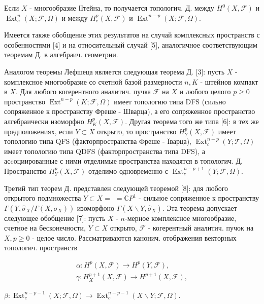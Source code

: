 \documentclass[10pt]{article}
\begin{document}
Если $X$ - многообразие ІІтейна, то получается топологич. Д. между $H^{0}(X, \mathscr{F})$ и $\operatorname{Ext}_{c}^{n}(X ; \mathscr{F}, \Omega)$ и между $H_{c}^{p}(X, \mathscr{F})$ и $\operatorname{Ext}^{n-p}(X ; \mathscr{F}, \Omega)$.



Имеется также обобщение этих результатов на случай комплексных пространств с особенностями [4] и на относительный случай [5], аналогичное соответствующим теоремам Д. в алгебраич. геометрии.



Аналогом теоремы Лефшеца является следующая теорема Д. [3]: пусть $X$ - комплексное многообразие со счетной базой размерности $n, K$ - штейнов компакт в $X$. Для любого когерентного аналитич. пучка $\mathcal{F}$ на $X$ и любого целого $p \geqslant 0$ пространство $\operatorname{Ext}^{n-p}(K ; \mathscr{F}, \Omega)$ имеет топологию типа DFS (сильно сопряженное к пространству Фреше - Шварца), а его сопряженное пространство алгебраически изоморфно $H_{K}^{p}(X, \mathcal{F})$. Другая теорема того же типа [6]: в тех же предположениях, если $Y \subset X$ открыто, то пространство $H_{Y}^{p}(X, \mathscr{F})$ имеет топологию типа QFS (факторпространства Фреше - Ïварца), $\operatorname{Ext}_{c}^{n-p}(Y ; \mathscr{T}, \Omega)$ имеет топологию типа QDFS (факторпространства типа DFS), а асcоциированные с ними отделимые пространства находятся в топологич. Д. Пространство $H_{Y}^{p}(X, \mathscr{F})$ отделимо одновременно с $\operatorname{Ext}_{c}^{n-p+1}(Y ; \mathscr{F}, \Omega)$.



Третий тип теорем Д. представлен следующей теоремой [8]: для любого открытого подмножества $Y \subset X=$ $=\mathbb{C} P^{1}$ - сильное сопряженное к пространству $\Gamma\left(Y, \hat{\sigma}_{X} / \Gamma\left(X, \sigma_{X}\right)\right)$ изоморфоно $\Gamma\left(X \backslash Y, \hat{\sigma}_{X}\right)$. Эта теорема допускает следующее обобщение [7]: пусть $X$ - $n$-мерное комплексное многообразие, счетное на бесконечности, $Y \subset X$ открыто, $\mathscr{\mathcal { F }}$ - когерентный аналитич. пучок на $X, p \geqslant 0$ - целое число. Рассматриваются канонич. отображения векторных топологич. пространств



\[

\begin{gathered}

\alpha: H^{p}(X, \mathscr{F}) \longrightarrow H^{p}(Y, \mathscr{F}), \\

\gamma: H_{X}^{p+1}(X, \mathscr{F}) \longrightarrow H^{p+1}(X, \mathscr{F}),

\end{gathered}

\]



$\beta: \operatorname{Ext}_{c}^{n-p-1}(X ; \mathscr{F}, \Omega) \longrightarrow \operatorname{Ext}_{c}^{n-p-1}(X \backslash Y ; \mathscr{F}, \Omega)$.
\end{document}

